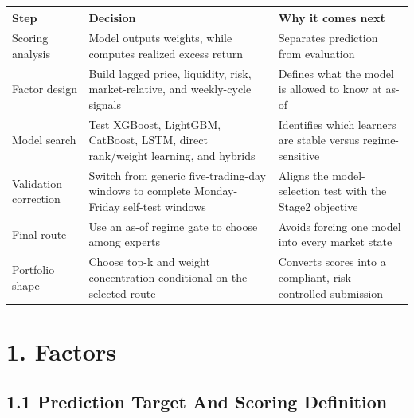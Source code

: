 \documentclass[11pt]{article}
\newcommand{\code}[1]{{\ttfamily\footnotesize\seqsplit{#1}}}
\begin{document}
\begin{longtable}[]{@{}|
  >{\RaggedRight\arraybackslash}m{}|
  >{\RaggedRight\arraybackslash}m{}|
  >{\RaggedRight\arraybackslash}m{}|@{}}
\hline\rowcolor{tableHead}
\begin{minipage}[c]{\linewidth}\centering\bfseries
Step
\end{minipage} & \begin{minipage}[c]{\linewidth}\centering\bfseries
Decision
\end{minipage} & \begin{minipage}[c]{\linewidth}\centering\bfseries
Why it comes next
\end{minipage} \\
\hline
\endhead
\hline
\endlastfoot
Scoring analysis & Model outputs weights, while
\code{score\_submission.py} computes realized excess return &
Separates prediction from evaluation \\
\hline
Factor design & Build lagged price, liquidity, risk, market-relative,
and weekly-cycle signals & Defines what the model is allowed to know at
as-of \\
\hline
Model search & Test XGBoost, LightGBM, CatBoost, LSTM, direct
rank/weight learning, and hybrids & Identifies which learners are stable
versus regime-sensitive \\
\hline
Validation correction & Switch from generic five-trading-day windows to
complete Monday-Friday self-test windows & Aligns the model-selection
test with the Stage2 objective \\
\hline
Final route & Use an as-of regime gate to choose among experts & Avoids
forcing one model into every market state \\
\hline
Portfolio shape & Choose top-k and weight concentration conditional on
the selected route & Converts scores into a compliant, risk-controlled
submission \\
\end{longtable}

\section{1. Factors}\label{factors}

\subsection{1.1 Prediction Target And Scoring
Definition}\label{prediction-target-and-scoring-definition}
\end{document}
